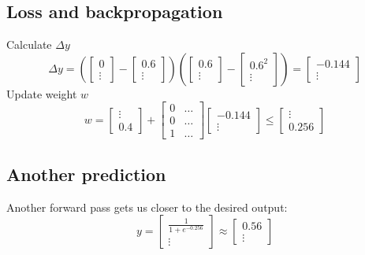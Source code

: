 \documentclass[10pt,a4paper]{article}
\begin{document}
\subsection{Loss and backpropagation}
Calculate $\Delta{y}$
\begin{equation}
	\Delta{y} = (
	\begin{bmatrix}
		0 \\
		\vdots
	\end{bmatrix}
	-
	\begin{bmatrix}
		0.6 \\
		\vdots
	\end{bmatrix}
	)(
	\begin{bmatrix}
		0.6 \\
		\vdots
	\end{bmatrix}
	-
	\begin{bmatrix}
		0.6^2 \\
		\vdots
	\end{bmatrix}
	) =
	\begin{bmatrix}
		-0.144 \\
		\vdots
	\end{bmatrix}
\end{equation}
Update weight $w$
\begin{equation}
	w =
	\begin{bmatrix}
		\vdots \\
		0.4
	\end{bmatrix}
	+
	\begin{bmatrix}
		0 & \ldots \\
		0 & \ldots \\
		1 & \ldots
	\end{bmatrix}
	\begin{bmatrix}
		-0.144 \\
		\vdots
	\end{bmatrix}
	\leq
	\begin{bmatrix}
		\vdots \\
		0.256
	\end{bmatrix}
\end{equation}

\subsection{Another prediction}
Another forward pass gets us closer to the desired output:
\begin{equation}
	y =
	\begin{bmatrix}
		\frac{1}{1+e^{-0.256}} \\
		\vdots
	\end{bmatrix}
	\approx
	\begin{bmatrix}
		0.56 \\
		\vdots
	\end{bmatrix}
\end{equation}
\end{document}
